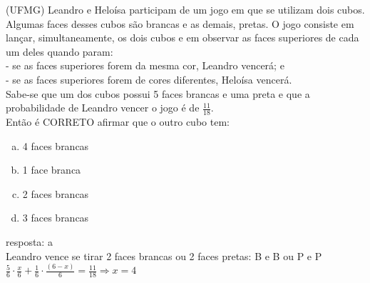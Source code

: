 \begin{ex}
 (UFMG) Leandro e Heloísa participam de um jogo em que se utilizam dois cubos. Algumas faces desses cubos são brancas e as demais, pretas. O jogo consiste em lançar, simultaneamente, os dois cubos e em observar as faces superiores de cada um deles quando param:\\
- se as faces superiores forem da mesma cor, Leandro vencerá; e\\
- se as faces superiores forem de cores diferentes, Heloísa vencerá.\\
Sabe-se que  um dos cubos possui 5 faces brancas e uma preta e que a probabilidade de Leandro vencer o jogo é de $\frac{11}{18}$.\\
Então é CORRETO afirmar que o outro cubo tem:
    \begin{enumerate}[(a)]
    \item 4 faces brancas
    \item 1 face branca
    \item 2 faces brancas
    \item 3 faces brancas
    \end{enumerate}
      \begin{sol}
       resposta: a  \\
       Leandro vence se tirar 2 faces brancas ou 2 faces pretas: B e B ou P e P\\ $\frac{5}{6}\cdot\frac{x}{6}+\frac{1}{6}\cdot\frac{(6-x)}{6}=\frac{11}{18}\Longrightarrow x=4$
      \end{sol}
\end{ex}